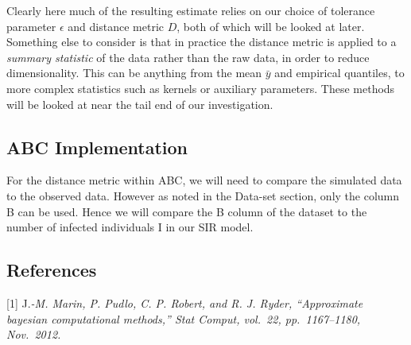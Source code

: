 \documentclass[
]{article}
\begin{document}
Clearly here much of the resulting estimate relies on our choice of
tolerance parameter \(\epsilon\) and distance metric \(D\), both of
which will be looked at later. Something else to consider is that in
practice the distance metric is applied to a \emph{summary statistic} of
the data rather than the raw data, in order to reduce dimensionality.
This can be anything from the mean \(\bar{y}\) and empirical quantiles,
to more complex statistics such as kernels or auxiliary parameters.
These methods will be looked at near the tail end of our investigation.

\hypertarget{abc-implementation}{%
\subsection{ABC Implementation}\label{abc-implementation}}

For the distance metric within ABC, we will need to compare the
simulated data to the observed data. However as noted in the Data-set
section, only the column B can be used. Hence we will compare the B
column of the dataset to the number of infected individuals I in our SIR
model.

\hypertarget{references}{%
\subsection{References}\label{references}}

{[}1{]} J.\emph{-M. Marin, P. Pudlo, C. P. Robert, and R. J. Ryder,
``Approximate bayesian computational methods,'' Stat Comput, vol.~22,
pp.~1167--1180, Nov.~2012.}
\end{document}
